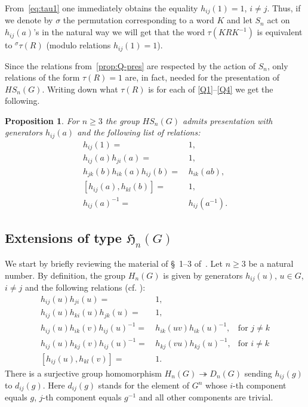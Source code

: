 \documentclass[oneside, 12pt]{amsart}
\theoremstyle{plain}
\numberwithin{equation}{section}
\numberwithin{lemma}{section}
\newtheorem{prop}[lemma]{Proposition}
\theoremstyle{remark}
\theoremstyle{definition}
\begin{document}
From~\eqref{eq:tau1} one immediately obtains the equality $h_{ij}(1)=1$, $i\neq j$.
Thus, if we denote by $\sigma$ the permutation corresponding to a word $K$ and let $S_n$ act on $h_{ij}(a)$'s in the natural way
 we will get that the word $\tau(KRK^{-1})$ is equivalent to ${}^{\sigma}\tau(R)$ (modulo relations $h_{ij}(1)=1$). 

Since the relations from~\cref{prop:Q-pres} are respected by the action of $S_n$,
 only relations of the form $\tau(R)=1$ are, in fact, needed for the presentation of $HS_n(G)$.
Writing down what $\tau(R)$ is for each of \eqref{Q1}--\eqref{Q4} we get the following.
 
\begin{prop} \label{prop:HSpres} For $n\geq 3$ the group $HS_n(G)$ admits presentation with generators $h_{ij}(a)$ and the following list of relations:
\begin{align}
h_{ij}(1)                     = &\, 1,              \tag{R0} \label{H0} \\
h_{ij}(a) h_{ji}(a)           = &\, 1,              \tag{R1} \label{H1} \\
h_{jk}(b) h_{ik}(a) h_{ij}(b) = &\, h_{ik}(ab),     \tag{R2} \label{H2} \\
[h_{ij}(a), h_{kl}(b)]        = &\, 1,              \tag{R3} \label{H3} \\
h_{ij}(a)^{-1}                = &\, h_{ij}(a^{-1}). \tag{R4} \label{H4}
\end{align}
\end{prop}

\subsection{Extensions of type \texorpdfstring{$\mathfrak{H}_n(G)$}{Hn(G)}} \label{sec:Hnextensions}
We start by briefly reviewing the material of \S~1--3 of~\cite{Reh78}. 
Let $n \geq 3$ be a natural number. By definition, the group $H_n(G)$ is given by generators
$h_{ij}(u)$, $u\in G$, $i\neq j$ and the following relations (cf. \cite[H1--H5~of~\S~2]{Reh78}):
\begin{align}
h_{ij}(u) h_{ji}(u)                = &\, 1,                        &                     \tag{H1} \label{RH1} \\
h_{ij}(u) h_{ki}(u) h_{jk}(u)      = &\, 1,                        &                     \tag{H2} \label{RH2} \\
h_{ij}(u) h_{ik}(v) h_{ij}(u)^{-1} = &\, h_{ik}(uv) h_{ik}(u)^{-1},& \text{for } j\neq k \tag{H3} \label{RH3} \\
h_{ij}(u) h_{kj}(v) h_{ij}(u)^{-1} = &\, h_{kj}(vu) h_{kj}(u)^{-1},& \text{for } i\neq k \tag{H4} \label{RH4} \\
[h_{ij}(u), h_{kl}(v)]             = &\, 1.                        &                     \tag{H5} \label{RH5} \end{align}
There is a surjective group homomorphism $H_n(G) \twoheadrightarrow D_n(G)$ sending $h_{ij}(g)$ to $d_{ij}(g)$.
Here $d_{ij}(g)$ stands for the element of $G^n$ whose
 $i$-th component equals $g$, $j$-th component equals $g^{-1}$ and all other components are trivial.
\end{document}
